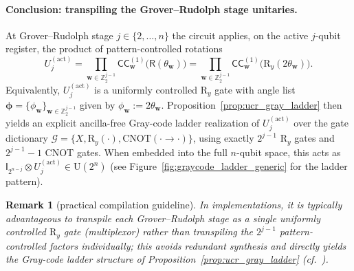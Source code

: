 \documentclass{article}
\newtheorem{remark}[theorem]{Remark}
\newcommand{\CC}{\mathsf{C}\mathsf{C}}
\newcommand{\rI}{\mathsf{I}}
\newcommand{\rR}{\mathsf{R}}
\newcommand{\RY}{\mathrm{R}_y}
\newcommand{\CNOT}{\mathrm{CNOT}}
\numberwithin{equation}{section}
\begin{document}
\paragraph{Conclusion: transpiling the Grover--Rudolph stage unitaries.}
At Grover--Rudolph stage $j\in\{2,\dots,n\}$ the circuit applies, on the active $j$-qubit register,
the product of pattern-controlled rotations
\[
U_j^{\mathrm{(act)}}=\prod_{\mathbf{w}\in\mathbb{Z}_2^{j-1}}\CC_{\mathbf{w}}^{(1)}\!\bigl(\rR(\theta_{\mathbf{w}})\bigr)
=\prod_{\mathbf{w}\in\mathbb{Z}_2^{j-1}}\CC_{\mathbf{w}}^{(1)}\!\bigl(\RY(2\theta_{\mathbf{w}})\bigr).
\]
Equivalently, $U_j^{\mathrm{(act)}}$ is a uniformly controlled $\RY$ gate with angle list
$\bm{\phi}=\{\phi_{\mathbf{w}}\}_{\mathbf{w}\in\mathbb{Z}_2^{j-1}}$ given by $\phi_{\mathbf{w}}:=2\theta_{\mathbf{w}}$.
Proposition~\ref{prop:ucr_gray_ladder} then yields an explicit ancilla-free Gray-code ladder realization of
$U_j^{\mathrm{(act)}}$ over the gate dictionary
$\mathcal{G}=\{X,\RY(\cdot),\CNOT(\cdot\to\cdot)\}$, using exactly $2^{j-1}$ $\RY$ gates and $2^{j-1}-1$ $\CNOT$ gates.
When embedded into the full $n$-qubit space, this acts as $\rI_{2^{n-j}}\otimes U_j^{\mathrm{(act)}}\in\mathrm{U}(2^n)$
(see Figure~\ref{fig:graycode_ladder_generic} for the ladder pattern).


\begin{remark}[practical compilation guideline]\label{rem:compile_stage}
In implementations, it is typically advantageous to transpile each Grover--Rudolph stage as a single
uniformly controlled $\RY$ gate (multiplexor) rather than transpiling the $2^{j-1}$ pattern-controlled factors
individually; this avoids redundant synthesis and directly yields the Gray-code ladder structure of
Proposition~\ref{prop:ucr_gray_ladder} (cf.~\cite{Bergholm2005}).
\end{remark}
\end{document}
